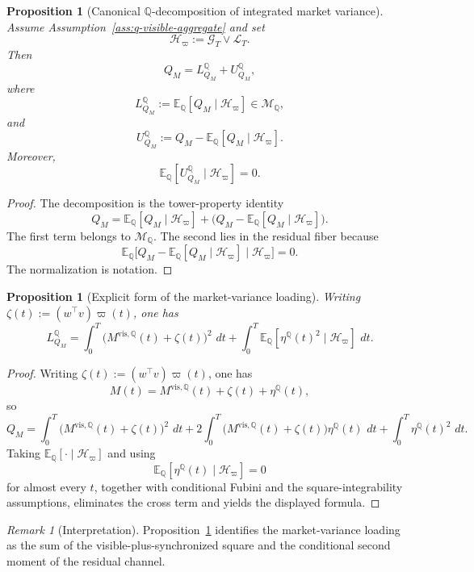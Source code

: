\documentclass[11pt,a4paper]{amsart}
\theoremstyle{plain}
\newtheorem{proposition}[theorem]{Proposition}
\theoremstyle{definition}
\theoremstyle{remark}
\newtheorem{remark}[theorem]{Remark}
\newcommand{\QQ}{\mathbb{Q}}
\newcommand{\EE}{\mathbb{E}}
\newcommand{\cG}{\mathcal{G}}
\newcommand{\cH}{\mathcal{H}}
\newcommand{\cL}{\mathcal{L}}
\newcommand{\cM}{\mathcal{M}}
\newcommand{\dd}{\,d}
\begin{document}
\begin{proposition}[Canonical \(\QQ\)-decomposition of integrated market variance]\label{prop:q-qm}
Assume Assumption~\ref{ass:q-visible-aggregate} and set
\[
        \cH_\varpi:=\cG_T\vee \cL_T.
\]
Then
\[
        Q_M=L_{Q_M}^\QQ+U_{Q_M}^\QQ,
\]
where
\[
        L_{Q_M}^\QQ:=\EE_\QQ[Q_M\mid \cH_\varpi]\in \cM_\QQ,
\]
and
\[
        U_{Q_M}^\QQ:=Q_M-\EE_\QQ[Q_M\mid \cH_\varpi].
\]
Moreover,
\[
        \EE_\QQ[U_{Q_M}^\QQ\mid \cH_\varpi]=0.
\]
\end{proposition}

\begin{proof}
The decomposition is the tower-property identity
\[
        Q_M
        =
        \EE_\QQ[Q_M\mid \cH_\varpi]
        +
        \bigl(Q_M-\EE_\QQ[Q_M\mid \cH_\varpi]\bigr).
\]
The first term belongs to \(\cM_\QQ\).  The second lies in the residual fiber because
\[
        \EE_\QQ\bigl[Q_M-\EE_\QQ[Q_M\mid \cH_\varpi]\mid \cH_\varpi\bigr]=0.
\]
The normalization is notation.
\end{proof}

\begin{proposition}[Explicit form of the market-variance loading]\label{prop:q-qm-explicit}
Writing \(\zeta(t):=(w^\top v)\varpi(t)\), one has
\[
        L_{Q_M}^\QQ
        =
        \int_0^T \bigl(M^{\mathrm{vis},\QQ}(t)+\zeta(t)\bigr)^2\,\dd t
        +
        \int_0^T \EE_\QQ[\eta^\QQ(t)^2\mid \cH_\varpi]\,\dd t.
\]
\end{proposition}

\begin{proof}
Writing \(\zeta(t):=(w^\top v)\varpi(t)\), one has
\[
        M(t)=M^{\mathrm{vis},\QQ}(t)+\zeta(t)+\eta^\QQ(t),
\]
so
\[
        Q_M
        =
        \int_0^T \bigl(M^{\mathrm{vis},\QQ}(t)+\zeta(t)\bigr)^2\,\dd t
        +
        2\int_0^T \bigl(M^{\mathrm{vis},\QQ}(t)+\zeta(t)\bigr)\eta^\QQ(t)\,\dd t
        +
        \int_0^T \eta^\QQ(t)^2\,\dd t.
\]
Taking \(\EE_\QQ[\cdot\mid \cH_\varpi]\) and using
\[
        \EE_\QQ[\eta^\QQ(t)\mid \cH_\varpi]=0
\]
for almost every \(t\), together with conditional Fubini and the square-integrability
assumptions, eliminates the cross term and yields the displayed formula.
\end{proof}

\begin{remark}[Interpretation]
Proposition~\ref{prop:q-qm-explicit} identifies the market-variance loading as the
sum of the visible-plus-synchronized square and the conditional second moment of the residual
channel.
\end{remark}
\end{document}
